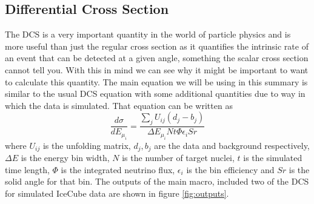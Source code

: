 \documentclass[12pt]{article}
\numberwithin{equation}{section}
\numberwithin{figure}{section}
\begin{document}
\subsection{Differential Cross Section}
The DCS is a very important quantity in the world of particle physics and is more useful than just the regular cross section as it quantifies the intrinsic rate of an event that can be detected at a given angle, something the scalar cross section cannot tell you. With this in mind we can see why it might be important to want to calculate this quantity. The main equation we will be using in this summary is similar to the usual DCS equation with some additional quantities due to way in which the data is simulated. That equation can be written as
\begin{equation}
	\frac{d\sigma}{dE_{\mu_i}} = \frac{\sum\limits_j U_{ij}(d_j-b_j)}{\Delta E_{\mu_i} N t\Phi\epsilon_i Sr}
	\label{eq:DCS}
\end{equation}
where $U_{ij}$ is the unfolding matrix, $d_j,b_j$ are the data and background respectively, $\Delta E$ is the energy bin width, $N$ is the number of target nuclei, $t$ is the simulated time length, $\Phi$ is the integrated neutrino flux, $\epsilon_i$ is the bin efficiency and $Sr$ is the solid angle for that bin. The outputs of the main macro, included two of the DCS for simulated IceCube data are shown in figure \ref{fig:outputs}.
\end{document}
